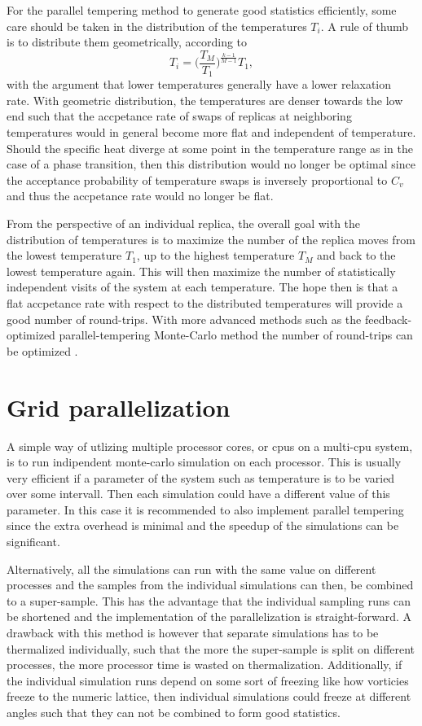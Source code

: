For the parallel tempering method to generate good statistics efficiently, some care should be taken in the distribution of the temperatures $T_i$.
A rule of thumb is to distribute them geometrically, \ie according to
\begin{equation}
    \label{eq:Monte:PT:geometricTemperatures}
    T_i = \bigg(\frac{T_M}{T_1}\bigg)^{\frac{k-1}{M-1}}T_1,
\end{equation}
with the argument that lower temperatures generally have a lower relaxation rate. With geometric distribution, the temperatures are denser towards
the low end such that the accpetance rate of swaps of replicas at neighboring temperatures would in general become more flat and independent of temperature.
Should the specific heat diverge at some point in the temperature range as in the case of a phase transition, then this distribution would no
longer be optimal since the acceptance probability of temperature swaps is inversely proportional to $C_v$ and thus the accpetance rate would no
longer be flat.

From the perspective of an individual replica, the overall goal with the distribution of temperatures is to maximize the number of the replica moves
from the lowest temperature $T_1$, up to the highest temperature $T_M$ and back to the lowest temperature again. This will then maximize the number
of statistically independent visits of the system at each temperature. The hope then is that a flat accpetance rate with respect to the distributed
temperatures will provide a good number of round-trips. With more advanced methods such as the feedback-optimized parallel-tempering Monte-Carlo
method the number of round-trips can be optimized \cite{Katzgraber06}.

\section{Grid parallelization}

A simple way of utlizing multiple processor cores, or cpus on a multi-cpu system, is to run indipendent monte-carlo simulation on each processor. This
is usually very efficient if a parameter of the system such as temperature is to be varied over some intervall. Then each simulation could have a
different value of this parameter. In this case it is recommended to also implement parallel tempering since the extra overhead is minimal and the
speedup of the simulations can be significant.

Alternatively, all the simulations can run with the same value on different processes and the samples from the individual simulations can then,
be combined to a super-sample. This has the advantage that the individual sampling runs can be shortened and the implementation of the parallelization
is straight-forward. A drawback with this method is however that separate simulations has to be thermalized individually, such that the more the
super-sample is split on different processes, the more processor time is wasted on thermalization. Additionally, if the individual simulation
runs depend on some sort of freezing like how vorticies freeze to the numeric lattice, then individual simulations could freeze at different
angles such that they can not be combined to form good statistics.


